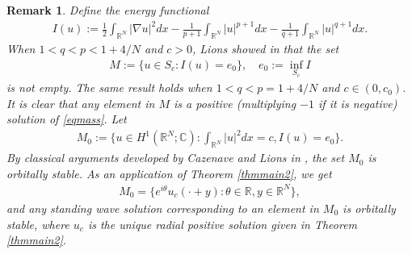 \documentclass{article}
\newtheorem{remark}[theorem]{Remark}
\theoremstyle{definition} \theoremstyle{remark}
\numberwithin{equation}{section}
\newcommand{\R}{\mathbb{R}}
\begin{document}
	\begin{remark} \label{rmkstability}
		Define the energy functional
		\begin{align}
			I(u) := \frac{1}{2}\int_{\R^N}|\nabla u|^2dx - \frac{1}{p+1}\int_{\R^N}|u|^{p+1}dx - \frac{1}{q+1}\int_{\R^N}|u|^{q+1}dx.
		\end{align}
		When $1 < q < p < 1+4/N$ and $c > 0$, Lions showed in \cite{Lions} that the set
		\begin{align*}
			M := \big\{u \in S_c: I(u) = e_0\big\}, \quad e_0 := \inf_{S_c}I
		\end{align*}
		is not empty. The same result holds when $1 < q < p = 1+4/N$ and $c \in (0,c_0)$. It is clear that any element in $M$ is a positive (multiplying $-1$ if it is negative) solution of \eqref{eqmass}. Let
		\begin{align}
			M_0 := \big\{u \in H^1(\R^N;\mathbb{C}): \int_{\R^N}|u|^2dx = c, I(u) = e_0\big\}.
		\end{align}
		By classical arguments developed by Cazenave and Lions in \cite{CLions}, the set $M_0$ is orbitally stable. As an application of Theorem \ref{thmmain2}, we get
		\begin{align*}
			M_0 = \big\{e^{i\theta} u_c(\cdot + y): \theta \in \R, y \in \R^N \big\},
		\end{align*}
		and any standing wave solution corresponding to an element in $M_0$ is orbitally stable, where $u_c$ is the unique radial positive solution given in Theorem \ref{thmmain2}.
	\end{remark}
\end{document}
